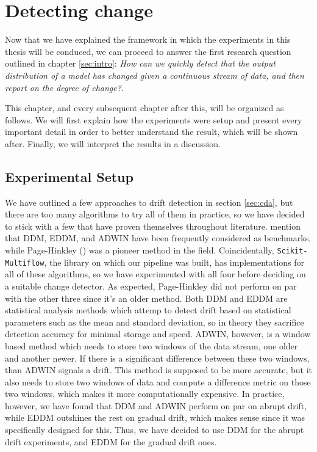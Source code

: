 \documentclass[12pt]{extreport}
\begin{document}
\chapter{Detecting change} \label{sec:detecting}

Now that we have explained the framework in which the experiments in this thesis will be conduced, we can proceed to answer the first research question outlined in chapter \ref{sec:intro}: \emph{How can we quickly detect that the output distribution of a model has changed given a continuous stream of data, and then report on the degree of change?}.

This chapter, and every subsequent chapter after this, will be organized as follows. We will first explain how the experiments were setup and present every important detail in order to better understand the result, which will be shown after. Finally, we will interpret the results in a discussion.

\section{Experimental Setup}

We have outlined a few approaches to drift detection in section \ref{sec:cda}, but there are too many algorithms to try all of them in practice, so we have decided to stick with a few that have proven themselves throughout literature. \cite{mcdiarmid} mention that DDM, EDDM, and ADWIN have been frequently considered as benchmarks, while Page-Hinkley (\cite{pagehinkley}) was a pioneer method in the field. Coincidentally, \texttt{Scikit-Multiflow}, the library on which our pipeline was built, has implementations for all of these algorithms, so we have experimented with all four before deciding on a suitable change detector. As expected, Page-Hinkley did not perform on par with the other three since it's an older method. Both DDM and EDDM are statistical analysis methods which attemp to detect drift based on statistical parameters such as the mean and standard deviation, so in theory they sacrifice detection accuracy for minimal storage and speed. ADWIN, however, is a window based method which needs to store two windows of the data stream, one older and another newer. If there is a significant difference between these two windows, than ADWIN signals a drift. This method is supposed to be more accurate, but it also needs to store two windows of data and compute a difference metric on those two windows, which makes it more computationally expensive. In practice, however, we have found that DDM and ADWIN perform on par on abrupt drift, while EDDM outshines the rest on gradual drift, which makes sense since it was specifically designed for this. Thus, we have decided to use DDM for the abrupt drift experiments, and EDDM for the gradual drift ones.
\end{document}
